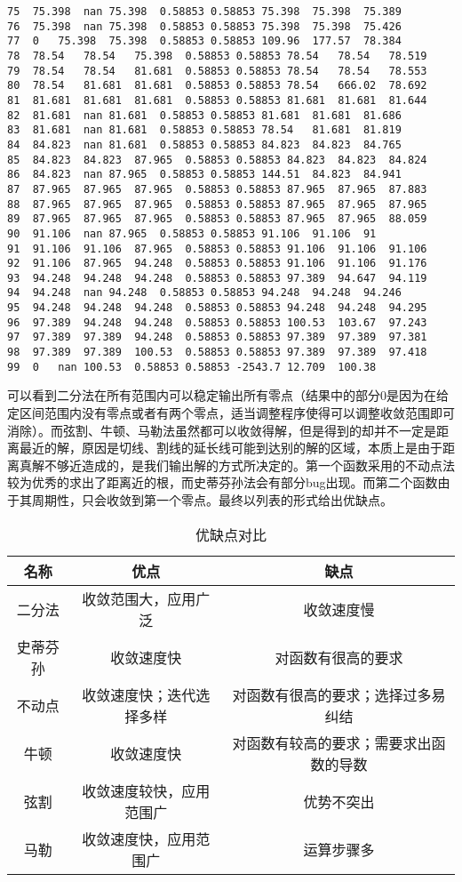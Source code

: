 \documentclass[a4paper,11pt,onecolumn,twoside]{article}
\begin{document}
\begin{lstlisting}
75	75.398	nan	75.398	0.58853	0.58853	75.398	75.398	75.389
76	75.398	nan	75.398	0.58853	0.58853	75.398	75.398	75.426
77	0	75.398	75.398	0.58853	0.58853	109.96	177.57	78.384
78	78.54	78.54	75.398	0.58853	0.58853	78.54	78.54	78.519
79	78.54	78.54	81.681	0.58853	0.58853	78.54	78.54	78.553
80	78.54	81.681	81.681	0.58853	0.58853	78.54	666.02	78.692
81	81.681	81.681	81.681	0.58853	0.58853	81.681	81.681	81.644
82	81.681	nan	81.681	0.58853	0.58853	81.681	81.681	81.686
83	81.681	nan	81.681	0.58853	0.58853	78.54	81.681	81.819
84	84.823	nan	81.681	0.58853	0.58853	84.823	84.823	84.765
85	84.823	84.823	87.965	0.58853	0.58853	84.823	84.823	84.824
86	84.823	nan	87.965	0.58853	0.58853	144.51	84.823	84.941
87	87.965	87.965	87.965	0.58853	0.58853	87.965	87.965	87.883
88	87.965	87.965	87.965	0.58853	0.58853	87.965	87.965	87.965
89	87.965	87.965	87.965	0.58853	0.58853	87.965	87.965	88.059
90	91.106	nan	87.965	0.58853	0.58853	91.106	91.106	91
91	91.106	91.106	87.965	0.58853	0.58853	91.106	91.106	91.106
92	91.106	87.965	94.248	0.58853	0.58853	91.106	91.106	91.176
93	94.248	94.248	94.248	0.58853	0.58853	97.389	94.647	94.119
94	94.248	nan	94.248	0.58853	0.58853	94.248	94.248	94.246
95	94.248	94.248	94.248	0.58853	0.58853	94.248	94.248	94.295
96	97.389	94.248	94.248	0.58853	0.58853	100.53	103.67	97.243
97	97.389	97.389	94.248	0.58853	0.58853	97.389	97.389	97.381
98	97.389	97.389	100.53	0.58853	0.58853	97.389	97.389	97.418
99	0	nan	100.53	0.58853	0.58853	-2543.7	12.709	100.38
\end{lstlisting}
\newpage
可以看到二分法在所有范围内可以稳定输出所有零点（结果中的部分0是因为在给定区间范围内没有零点或者有两个零点，适当调整程序使得可以调整收敛范围即可消除）。而弦割、牛顿、马勒法虽然都可以收敛得解，但是得到的却并不一定是距离最近的解，原因是切线、割线的延长线可能到达别的解的区域，本质上是由于距离真解不够近造成的，是我们输出解的方式所决定的。第一个函数采用的不动点法较为优秀的求出了距离近的根，而史蒂芬孙法会有部分bug出现。而第二个函数由于其周期性，只会收敛到第一个零点。最终以列表的形式给出优缺点。
\begin{center}
\begin{table}[]
\begin{tabular}{|c|c|c|}
\hline
名称   & 优点           & 缺点                  \\ \hline
二分法  & 收敛范围大，应用广泛   & 收敛速度慢               \\ \hline
史蒂芬孙 & 收敛速度快        & 对函数有很高的要求           \\ \hline
不动点  & 收敛速度快；迭代选择多样 & 对函数有很高的要求；选择过多易纠结   \\ \hline
牛顿   & 收敛速度快        & 对函数有较高的要求；需要求出函数的导数 \\ \hline
弦割   & 收敛速度较快，应用范围广 & 优势不突出               \\ \hline
马勒   & 收敛速度快，应用范围广 & 运算步骤多               \\ \hline
\end{tabular}
\caption{优缺点对比}
\end{table}
\end{center}
\end{document}
